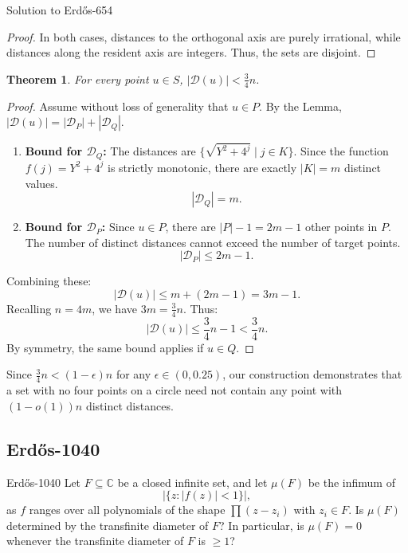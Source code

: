 \documentclass{article}
\theoremstyle{plain}
\newtheorem{theorem}{Theorem}
\theoremstyle{definition}
\begin{document}
\begin{solution}{Solution to {Erdős-654}}
\begin{proof}
In both cases, distances to the orthogonal axis are purely irrational, while distances along the resident axis are integers. Thus, the sets are disjoint.
\end{proof}

\begin{theorem}
For every point $u \in S$, $|\mathcal{D}(u)| < \frac{3}{4}n$.
\end{theorem}

\begin{proof}
Assume without loss of generality that $u \in P$.
By the Lemma, $|\mathcal{D}(u)| = |\mathcal{D}_P| + |\mathcal{D}_Q|$.
\begin{enumerate}
    \item \textbf{Bound for $\mathcal{D}_Q$:}
    The distances are $\{\sqrt{Y^2 + 4^j} \mid j \in K\}$. Since the function $f(j) = Y^2 + 4^j$ is strictly monotonic, there are exactly $|K| = m$ distinct values.
    \[ |\mathcal{D}_Q| = m. \]
    \item \textbf{Bound for $\mathcal{D}_P$:}
    Since $u \in P$, there are $|P|-1 = 2m-1$ other points in $P$. The number of distinct distances cannot exceed the number of target points.
    \[ |\mathcal{D}_P| \le 2m-1. \]
\end{enumerate}
Combining these:
\[
|\mathcal{D}(u)| \le m + (2m-1) = 3m - 1.
\]
Recalling $n = 4m$, we have $3m = \frac{3}{4}n$. Thus:
\[
|\mathcal{D}(u)| \le \frac{3}{4}n - 1 < \frac{3}{4}n.
\]
By symmetry, the same bound applies if $u \in Q$.
\end{proof}


Since $\frac{3}{4}n < (1-\epsilon)n$ for any $\epsilon \in (0, 0.25)$, our construction demonstrates that a set with no four points on a circle need not contain any point with $(1-o(1))n$ distinct distances.
\end{solution}





\subsection{Erdős-1040}

\begin{problem}{Erdős-1040 \cite{EHP58}}
    Let $F\subseteq \mathbb{C}$ be a closed infinite set, and let $\mu(F)$ be the infimum of\[\lvert \{ z: \lvert f(z)\rvert < 1\}\rvert,\]as $f$ ranges over all polynomials of the shape $\prod (z-z_i)$ with $z_i\in F$. Is $\mu(F)$ determined by the transfinite diameter of $F$? In particular, is $\mu(F)=0$ whenever the transfinite diameter of $F$ is $\geq 1$?
\end{problem}
\end{document}

